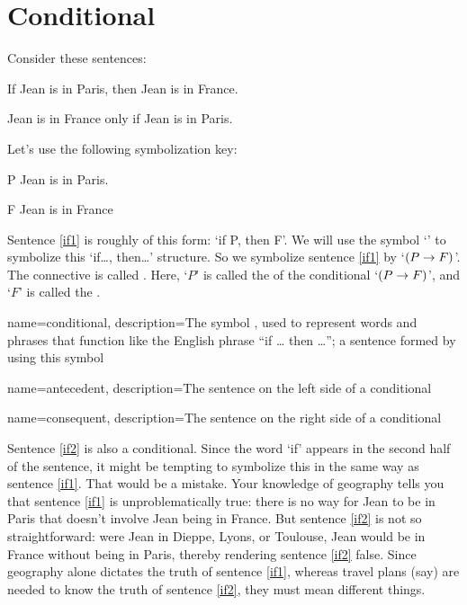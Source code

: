 \section{Conditional}
Consider these sentences:
	\begin{earg}
		\item[\ex{if1}] If Jean is in Paris, then Jean is in France.
		\item[\ex{if2}] Jean is in France only if Jean is in Paris.
	\end{earg}
Let's use the following symbolization key:
	\begin{ekey}
		\item[P] Jean is in Paris.
		\item[F] Jean is in France
	\end{ekey}
Sentence \ref{if1} is roughly of this form: `if P, then F'. We will use the symbol `\eif' to symbolize this `if\ldots, then\ldots' structure. So we symbolize sentence \ref{if1} by `$(P\rightarrow F)$'. The connective is called . Here, `$P$' is called the  of the conditional `$(P \rightarrow F)$', and `$F$' is called the .

{
name=conditional,
description={The symbol \eif, used to represent words and phrases that function like the English phrase ``if \dots{} then \dots''; a sentence formed by using this symbol}
}

{
name=antecedent,
description={The sentence on the left side of a \gls{conditional}}
}


{
name=consequent,
description={The sentence on the right side of a \gls{conditional}}
}

Sentence \ref{if2} is also a conditional. Since the word `if' appears in the second half of the sentence, it might be tempting to symbolize this in the same way as sentence \ref{if1}. That would be a mistake. Your knowledge of geography tells you that sentence \ref{if1} is unproblematically true: there is no way for Jean to be in Paris that doesn't involve Jean being in France. But sentence \ref{if2} is not so straightforward: were  Jean in Dieppe, Lyons, or Toulouse, Jean would be in France without being in Paris, thereby rendering sentence \ref{if2} false. Since geography alone dictates the truth of sentence \ref{if1}, whereas travel plans (say) are needed to know the truth of sentence \ref{if2}, they must mean different things.

